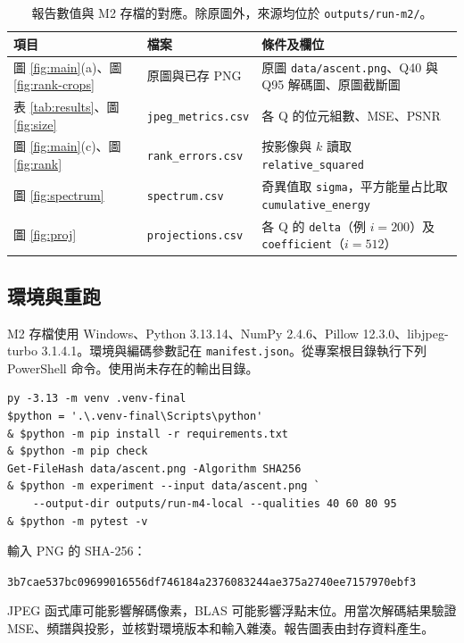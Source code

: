 \documentclass[12pt,a4paper,onecolumn]{article}
\begin{document}
\begin{table}[!htb]
\centering
\caption{報告數值與 M2 存檔的對應。除原圖外，來源均位於 \texttt{outputs/run-m2/}。}
\label{tab:sources}
\begin{tabular}{@{}p{.22\linewidth}p{.27\linewidth}p{.42\linewidth}@{}}
\toprule
項目 & 檔案 & 條件及欄位\\
\midrule
圖 \ref{fig:main}(a)、圖 \ref{fig:rank-crops} & 原圖與已存 PNG & 原圖 \texttt{data/ascent.png}、Q40 與 Q95 解碼圖、原圖截斷圖\\
表 \ref{tab:results}、圖 \ref{fig:size} & \texttt{jpeg\_metrics.csv} & 各 Q 的位元組數、MSE、PSNR\\
圖 \ref{fig:main}(c)、圖 \ref{fig:rank} & \texttt{rank\_errors.csv} & 按影像與 $k$ 讀取 \texttt{relative\_squared}\\
圖 \ref{fig:spectrum} & \texttt{spectrum.csv} & 奇異值取 \texttt{sigma}，平方能量占比取 \texttt{cumulative\_energy}\\
圖 \ref{fig:proj} & \texttt{projections.csv} & 各 Q 的 \texttt{delta}（例 $i=200$）及 \texttt{coefficient}（$i=512$）\\
\bottomrule
\end{tabular}
\end{table}

\subsection*{環境與重跑}
M2 存檔使用 Windows、Python 3.13.14、NumPy 2.4.6、Pillow 12.3.0、libjpeg-turbo 3.1.4.1。環境與編碼參數記在 \texttt{manifest.json}。從專案根目錄執行下列 PowerShell 命令。使用尚未存在的輸出目錄。
\begin{samepage}
\begin{verbatim}
py -3.13 -m venv .venv-final
$python = '.\.venv-final\Scripts\python'
& $python -m pip install -r requirements.txt
& $python -m pip check
Get-FileHash data/ascent.png -Algorithm SHA256
& $python -m experiment --input data/ascent.png `
    --output-dir outputs/run-m4-local --qualities 40 60 80 95
& $python -m pytest -v
\end{verbatim}
\end{samepage}

\noindent 輸入 PNG 的 SHA-256：

\noindent\texttt{3b7cae537bc09699016556df746184a2376083244ae375a2740ee7157970ebf3}

JPEG 函式庫可能影響解碼像素，BLAS 可能影響浮點末位。用當次解碼結果驗證 MSE、頻譜與投影，並核對環境版本和輸入雜湊。報告圖表由封存資料產生。
\end{document}
